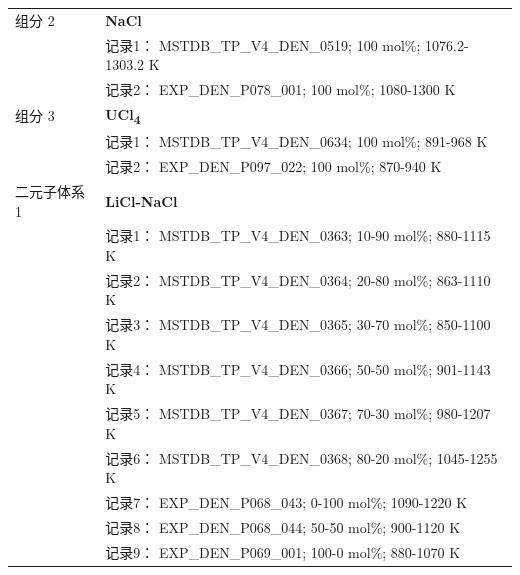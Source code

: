 \documentclass[12pt]{article}
\begin{document}
{\begin{longtable}[]{@{}
  >{\raggedright\arraybackslash}p{}
  >{\raggedright\arraybackslash}p{}@{}}
组分 2  & \textbf{NaCl} \\
 & 记录1： MSTDB\_TP\_V4\_DEN\_0519; 100 mol\%; 1076.2-1303.2 K \\
 & 记录2： EXP\_DEN\_P078\_001; 100 mol\%; 1080-1300 K  \\

组分 3  & \textbf{UCl\textsubscript{4}} \\
 & 记录1： MSTDB\_TP\_V4\_DEN\_0634; 100 mol\%; 891-968 K \\
 & 记录2： EXP\_DEN\_P097\_022; 100 mol\%; 870-940 K  \\

二元子体系 1  & \textbf{LiCl-NaCl} \\
 & 记录1： MSTDB\_TP\_V4\_DEN\_0363; 10-90 mol\%; 880-1115 K \\
 & 记录2： MSTDB\_TP\_V4\_DEN\_0364; 20-80 mol\%; 863-1110 K \\
 & 记录3： MSTDB\_TP\_V4\_DEN\_0365; 30-70 mol\%; 850-1100 K \\
 & 记录4： MSTDB\_TP\_V4\_DEN\_0366; 50-50 mol\%; 901-1143 K \\
 & 记录5： MSTDB\_TP\_V4\_DEN\_0367; 70-30 mol\%; 980-1207 K \\
 & 记录6： MSTDB\_TP\_V4\_DEN\_0368; 80-20 mol\%; 1045-1255 K \\
 & 记录7： EXP\_DEN\_P068\_043; 0-100 mol\%; 1090-1220 K \\
 & 记录8： EXP\_DEN\_P068\_044; 50-50 mol\%; 900-1120 K \\
 & 记录9： EXP\_DEN\_P069\_001; 100-0 mol\%; 880-1070 K  \\


\end{longtable}}
\end{document}
